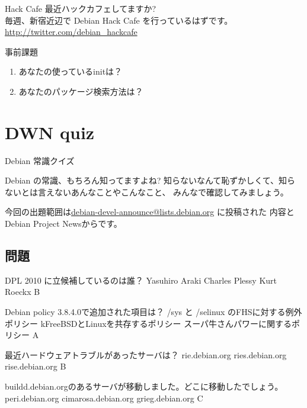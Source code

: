 \begin{frame}{Hack Cafe}
 最近ハックカフェしてますか?\\
 毎週、新宿近辺で Debian Hack Cafe を行っているはずです。\\
 \url{http://twitter.com/debian_hackcafe}\\
\end{frame}


\begin{frame}{事前課題}
\begin{enumerate}
 \item あなたの使っているinitは？
 \item あなたのパッケージ検索方法は？
\end{enumerate}
\end{frame}

{\footnotesize

}


\section{DWN quiz}
\begin{frame}{Debian 常識クイズ}

Debian の常識、もちろん知ってますよね?
知らないなんて恥ずかしくて、知らないとは言えないあんなことやこんなこと、
みんなで確認してみましょう。

今回の出題範囲は\url{debian-devel-announce@lists.debian.org} に投稿された
内容とDebian Project Newsからです。

\end{frame}

\subsection{問題}

\santaku
{DPL 2010 に立候補しているのは誰？}
{Yasuhiro Araki} %
{Charles Plessy}
{Kurt Roeckx}
{B}

\santaku
{Debian policy 3.8.4.0で追加された項目は？}
{/sys と /selinux のFHSに対する例外ポリシー}
{kFreeBSDとLinuxを共存するポリシー}
{スーパ牛さんパワーに関するポリシー}
{A}

\santaku
{最近ハードウェアトラブルがあったサーバは？}
{rie.debian.org}
{ries.debian.org} %
{rise.debian.org }
{B}

\santaku
{buildd.debian.orgのあるサーバが移動しました。どこに移動したでしょう。}
{peri.debian.org} %
{cimarosa.debian.org} %
{grieg.debian.org} %
{C}

